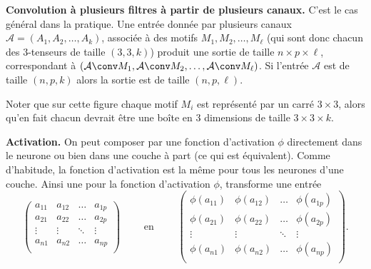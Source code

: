 \documentclass[11pt,class=report,crop=false]{standalone}
\begin{document}
   
   
\bigskip

\textbf{Convolution à plusieurs filtres à partir de plusieurs canaux.}   
C'est le cas général dans la pratique. 
Une entrée donnée par plusieurs canaux $\mathcal{A} = (A_1, A_2,\ldots, A_k)$,
associée à des motifs $M_1, M_2,\ldots,M_\ell$ (qui sont donc chacun des $3$-tenseurs de taille $(3,3,k)$) produit une sortie de taille $n \times p \times \ell$, correspondant à 
$(\mathcal{A} \conv M_1, \mathcal{A} \conv M_2, \ldots, \mathcal{A} \conv M_\ell)$.
Si l'entrée $\mathcal{A}$ est de taille $(n,p,k)$ alors la sortie est de taille $(n,p,\ell)$.

Noter que sur cette figure chaque motif $M_i$ est représenté par un carré $3\times3$, alors qu'en fait chacun devrait être une boîte en $3$ dimensions de taille $3\times 3\times k$.

\bigskip

\textbf{Activation.} On peut composer par une fonction d'activation $\phi$ directement dans le neurone ou bien dans une couche à part (ce qui est équivalent).
Comme d'habitude, la fonction d'activation est la même pour tous les neurones d'une couche. Ainsi une  pour la fonction d'activation $\phi$, transforme une entrée 
$$\begin{pmatrix}
  a_{11} & a_{12} & \ldots & a_{1p}  \\
  a_{21}  & a_{22}   & \ldots    & a_{2p}\\
  \vdots & \vdots & \ddots & \vdots  \\
  a_{n1} & a_{n2} & \ldots & a_{np}  \\
\end{pmatrix}
\qquad \text{ en } \qquad
\begin{pmatrix}
  \phi(a_{11}) & \phi(a_{12}) & \ldots & \phi(a_{1p})  \\
  \phi(a_{21})  & \phi(a_{22})   & \ldots    & \phi(a_{2p})\\
  \vdots & \vdots & \ddots & \vdots  \\
  \phi(a_{n1}) & \phi(a_{n2}) & \ldots & \phi(a_{np})  \\
\end{pmatrix}.
$$

\end{document}
